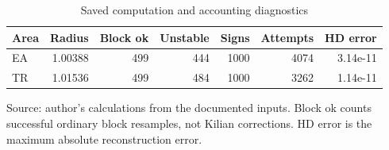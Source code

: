 \begin{table}[htbp]
\centering
\footnotesize
\caption{Saved computation and accounting diagnostics}
\begin{tabularx}{\linewidth}{Xrrrrrr}
\toprule
Area & Radius & Block ok & Unstable & Signs & Attempts & HD error \\
\midrule
EA & 1.00388 & 499 & 444 & 1000 & 4074 & 3.14e-11 \\
TR & 1.01536 & 499 & 484 & 1000 & 3262 & 1.14e-11 \\
\bottomrule
\end{tabularx}
\par\vspace{3pt}\begin{minipage}{\linewidth}\footnotesize Source: author's calculations from the documented inputs.\allowbreak{} Block ok counts successful ordinary block resamples, not Kilian corrections.\allowbreak{} HD error is the maximum absolute reconstruction error.\allowbreak{}\end{minipage}
\end{table}
